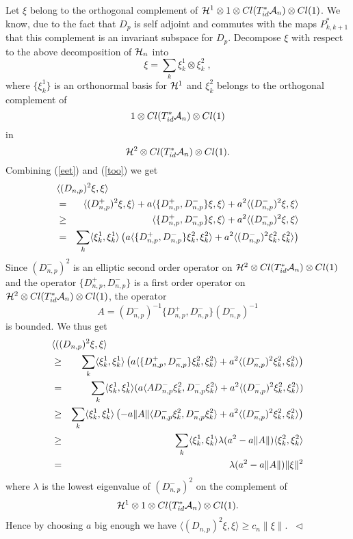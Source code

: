 \documentclass[12pt]{article}
\newcommand{\eproof}{{~\hfill$ \triangleleft$}}
\def\ca{{\cal A}}
\def\ch{{\cal H}}
\begin{document}
{Let $\xi$ belong to the orthogonal complement of $\ch^1 \otimes 1 \otimes Cl(T^*_{id}\ca_{n}) \otimes Cl(1)$. We know, due to the fact that $D_p$ is self adjoint and commutes with the maps $P^*_{k,k+1}$ that  this complement is an invariant subspace for $D_p$.
Decompose $\xi$ with respect to the above decomposition of $\ch_n$ into 
\begin{equation}
\xi = \sum_k  \xi^1_k\otimes \xi_k^2 \;,
\label{too}
\end{equation}
where $\{\xi_k^1\}$ is an orthonormal basis for $\ch^1$ and $\xi_k^2$ belongs to the orthogonal complement of 
$$1 \otimes Cl(T^*_{id}\ca_{n}) \otimes Cl(1)$$ 
in 
$$\ch^2 \otimes Cl(T^*_{id}\ca_{n}) \otimes Cl(1).$$ Combining (\ref{eet}) and (\ref{too}) we get
\begin{eqnarray*}
\lefteqn{\langle (D_{n,p})^2 \xi,\xi\rangle} \\
&=& \langle  (D^+_{n,p})^2\xi,\xi\rangle +a\langle \{ D^+_{n,p},D^-_{n,p}\}\xi,\xi\rangle + a^2\langle (D^-_{n,p})^2\xi,\xi\rangle\\
&\geq & \langle \{ D^+_{n,p},D^-_{n,p}\}\xi,\xi\rangle + a^2 \langle (D^-_{n,p})^2\xi,\xi\rangle \\
&=&\sum_k \langle \xi_k^1,\xi_k^1 \rangle \left(a\langle \{ D^+_{n,p},D^-_{n,p}\}\xi_k^2 ,\xi_k^2 \rangle+
a^2\langle (D^-_{n,p})^2 \xi_k^2 ,\xi_k^2 \rangle \right)
\end{eqnarray*}
Since $(D^-_{n,p})^2$ is an elliptic second order operator on $\ch^2\otimes Cl(T^*_{id}\ca_{n}) \otimes Cl(1)$ and the operator $\{ D^+_{n,p},D^-_{n,p}\}$ is a first order operator  on $\ch^2 \otimes Cl(T^*_{id}\ca_{n}) \otimes Cl(1)$, the operator
$$A=(D^-_{n,p})^{-1}\{ D^+_{n,p},D^-_{n,p}\} (D^-_{n,p})^{-1}$$
is bounded.  We thus get
\begin{eqnarray*}
\lefteqn{\langle ((D_{n,p})^2 \xi,\xi\rangle} \\
&\geq&\sum_k \langle \xi_k^1,\xi_k^1 \rangle \left(a\langle \{ D^+_{n,p},D_{n,p}^-\}\xi_k^2 ,\xi_k^2 \rangle+
a^2\langle (D^-_{n,p})^2 \xi_k^2 ,\xi_k^2 \rangle \right)\\
&=&\sum_k \langle \xi_k^1,\xi_k^1 \rangle ( a\langle A D^-_{n,p}\xi_k^2 ,D^-_{n,p}\xi_k^2 \rangle
+a^2\langle (D^-_{n,p})^2 \xi_k^2 ,\xi_k^2 \rangle )\\
&\geq & \sum_k \langle \xi_k^1,\xi_k^1 \rangle \left( -a\|A\|\langle  D^-_{n,p}\xi_k^2 ,D^-_{n,p}\xi_k^2 \rangle
+a^2\langle (D^-_{n,p})^2 \xi_k^2 ,\xi_k^2 \rangle \right)\\
&\geq & \sum_k \langle \xi_k^1,\xi_k^1 \rangle \lambda (a^2-a\|A\|)\langle  \xi_k^2 ,\xi_k^2 \rangle\\
&=&\lambda (a^2-a\| A\| )\|\xi\|^2
\end{eqnarray*}
where $\lambda$ is the lowest eigenvalue of $(D_{n,p}^-)^2$ on the complement of 
$$\ch^1\otimes 1 \otimes Cl(T^*_{id}\ca_{n}) \otimes Cl(1).$$
Hence by choosing $a$ big enough  we have $\langle (D_{n,p})^2\xi,\xi \rangle \geq c_n\|\xi \|$. \eproof
\\

}
\end{document}
